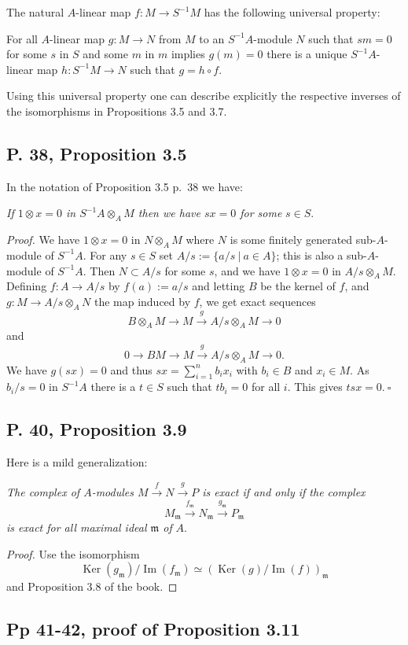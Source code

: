 \documentclass[parskip=half,fontsize=12pt]{scrartcl}%
\newcommand{\oo}{\operatorname}\newcommand{\ooo}{\operatorname*}
\newcommand{\mf}{\mathfrak}
\newcommand{\xr}{\xrightarrow}
\begin{document}
The natural $A$-linear map $f:M\to S^{-1}M$ has the following universal property:

For all $A$-linear map $g:M\to N$ from $M$ to an $S^{-1}A$-module $N$ such that $sm=0$ for some $s$ in $S$ and some $m$ in $m$ implies $g(m)=0$ there is a unique $S^{-1}A$-linear map $h:S^{-1}M\to N$ such that $g=h\circ f$.

Using this universal property one can describe explicitly the respective inverses of the isomorphisms in Propositions 3.5 and 3.7.

\subsection{P. 38, Proposition 3.5}%

In the notation of Proposition 3.5 p.~38 we have:

\emph{If $1\otimes x=0$ in $S^{-1}A\otimes_AM$ then we have $sx=0$ for some} $s\in S$.

\emph{Proof.} We have $1\otimes x=0$ in $N\otimes_AM$ where $N$ is some finitely generated sub-$A$-module of $S^{-1}A$. For any $s\in S$ set $A/s:=\{a/s\ |\ a\in A\}$; this is also a sub-$A$-module of $S^{-1}A$. Then $N\subset A/s$ for some $s$, and we have $1\otimes x=0$ in $A/s\otimes_AM$. Defining $f:A\to A/s$ by $f(a):=a/s$ and letting $B$ be the kernel of $f$, and $g:M\to A/s\otimes_AN$ the map induced by $f$, we get exact sequences 
$$
B\otimes_AM\to M\xr gA/s\otimes_AM\to0
$$ 
and 
$$
0\to BM\to M\xr gA/s\otimes_AM\to0.
$$ 
We have $g(sx)=0$ and thus $sx=\sum_{i=1}^nb_ix_i$ with $b_i\in B$ and $x_i\in M$. As $b_i/s=0$ in $S^{-1}A$ there is a $t\in S$ such that $tb_i=0$ for all $i$. This gives $tsx=0.\ \square$

\subsection{P. 40, Proposition 3.9}\label{re}%

Here is a mild generalization:

\emph{The complex of $A$-modules $M\xr fN\xr g P$ is exact if and only if the complex} 
$$
M_{\mf m}\xr{f_{\mf m}}N_{\mf m}\xr{g_{\mf m}}P_{\mf m}
$$ 
\emph{is exact for all maximal ideal $\mf m$ of} $A$.
\begin{proof}
Use the isomorphism 
$$
\oo{Ker}(g_{\mf m})/\oo{Im}(f_{\mf m})\simeq(\oo{Ker}(g)/\oo{Im}(f))_{\mf m}
$$ 
and Proposition 3.8 of the book.
\end{proof}

\subsection{Pp 41-42, proof of Proposition 3.11}%
\end{document}
